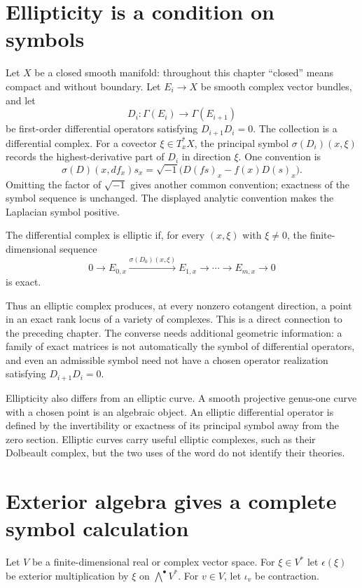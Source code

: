 \section{Ellipticity is a condition on symbols}

Let $X$ be a closed smooth manifold: throughout this chapter ``closed'' means compact and without boundary. Let $E_i\to X$ be smooth complex vector bundles, and let
\[
D_i:\Gamma(E_i)\longrightarrow\Gamma(E_{i+1})
\]
be first-order differential operators satisfying $D_{i+1}D_i=0$. The collection is a differential complex. For a covector $\xi\in T_x^*X$, the principal symbol $\sigma(D_i)(x,\xi)$ records the highest-derivative part of $D_i$ in direction $\xi$. One convention is
\[
\sigma(D)(x,df_x)s_x=\sqrt{-1}\bigl(D(fs)_x-f(x)D(s)_x\bigr).
\]
Omitting the factor of $\sqrt{-1}$ gives another common convention; exactness of the symbol sequence is unchanged. The displayed analytic convention makes the Laplacian symbol positive.

\begin{definition}
The differential complex is elliptic if, for every $(x,\xi)$ with $\xi\neq0$, the finite-dimensional sequence
\[
0\to E_{0,x}\xrightarrow{\sigma(D_0)(x,\xi)}E_{1,x}
 \to\cdots\to E_{m,x}\to0
\]
is exact.
\end{definition}

Thus an elliptic complex produces, at every nonzero cotangent direction, a point in an exact rank locus of a variety of complexes. This is a direct connection to the preceding chapter. The converse needs additional geometric information: a family of exact matrices is not automatically the symbol of differential operators, and even an admissible symbol need not have a chosen operator realization satisfying $D_{i+1}D_i=0$.

Ellipticity also differs from an elliptic curve. A smooth projective genus-one curve with a chosen point is an algebraic object. An elliptic differential operator is defined by the invertibility or exactness of its principal symbol away from the zero section. Elliptic curves carry useful elliptic complexes, such as their Dolbeault complex, but the two uses of the word do not identify their theories.

\section{Exterior algebra gives a complete symbol calculation}

Let $V$ be a finite-dimensional real or complex vector space. For $\xi\in V^*$ let $\epsilon(\xi)$ be exterior multiplication by $\xi$ on $\bigwedge^\bullet V^*$. For $v\in V$, let $\iota_v$ be contraction.


